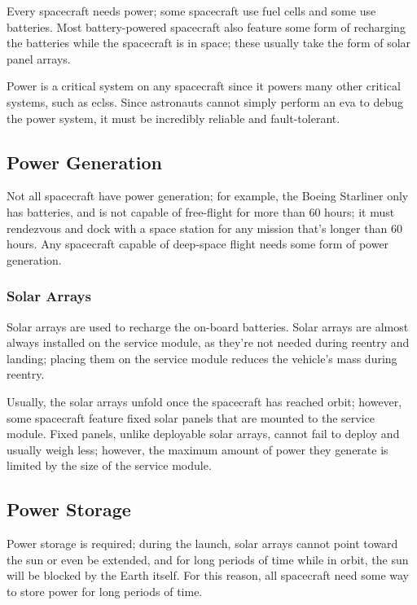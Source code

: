 Every spacecraft needs power; some spacecraft use fuel cells and some
use batteries. Most battery-powered spacecraft also feature some form
of recharging the batteries while the spacecraft is in space; these
usually take the form of solar panel arrays.

Power is a critical system on any spacecraft since it powers many
other critical systems, such as \acrshort{eclss}. Since astronauts cannot simply
perform an \acrshort{eva} to debug the power system, it must be incredibly
reliable and fault-tolerant.

\subsection{Power Generation}

Not all spacecraft have power generation; for example, the Boeing
Starliner only has batteries, and is not capable of free-flight for
more than 60 hours; it must rendezvous and dock with a space station
for any mission that's longer than 60 hours. Any spacecraft capable of
deep-space flight needs some form of power generation.

\subsubsection{Solar Arrays}

Solar arrays are used to recharge the on-board batteries. Solar arrays
are almost always installed on the service module, as they're not
needed during reentry and landing; placing them on the service module
reduces the vehicle's mass during reentry.

Usually, the solar arrays unfold once the spacecraft has reached
orbit; however, some spacecraft feature fixed solar panels that are
mounted to the service module. Fixed panels, unlike deployable solar
arrays, cannot fail to deploy and usually weigh less; however, the
maximum amount of power they generate is limited by the size of the
service module.

\subsection{Power Storage}

Power storage is required; during the launch, solar arrays cannot
point toward the sun or even be extended, and for long periods of time
while in orbit, the sun will be blocked by the Earth itself. For this
reason, all spacecraft need some way to store power for long periods
of time.

